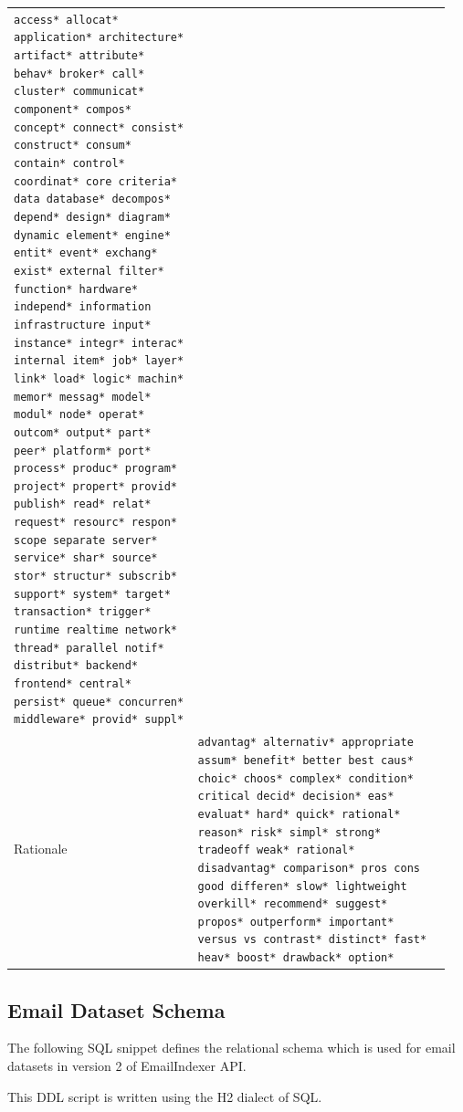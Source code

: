 \documentclass[a4paper, 12pt]{article}
\begin{document}
\begin{table}[H]
\begin{tabular}{p{0.4\linewidth} p{0.55\linewidth}}
				\texttt{access* allocat* application* architecture* artifact* attribute* behav* broker* call* cluster* communicat* component* compos* concept* connect* consist* construct* consum* contain* control* coordinat* core criteria* data database* decompos* depend* design* diagram* dynamic element* engine* entit* event* exchang* exist* external filter* function* hardware* independ* information infrastructure input* instance* integr* interac* internal item* job* layer* link* load* logic* machin* memor* messag* model* modul* node* operat* outcom* output* part* peer* platform* port* process* produc* program* project* propert* provid* publish* read* relat* request* resourc* respon* scope separate server* service* shar* source* stor* structur* subscrib* support* system* target* transaction* trigger* runtime realtime network* thread* parallel notif* distribut* backend* frontend* central* persist* queue* concurren* middleware* provid* suppl*}
				\\
				Rationale &
				\tiny
				\texttt{advantag* alternativ* appropriate assum* benefit* better best caus* choic* choos* complex* condition* critical decid* decision* eas* evaluat* hard* quick* rational* reason* risk* simpl* strong* tradeoff weak* rational* disadvantag* comparison* pros cons good differen* slow* lightweight overkill* recommend* suggest* propos* outperform* important* versus vs contrast* distinct* fast* heav* boost* drawback* option*}
				\\
			\end{tabular}
		\end{table}
	
	\newpage
	\subsection{Email Dataset Schema}
		\label{sec:dataset-schema}
		The following SQL snippet defines the relational schema which is used for email datasets in version 2 of EmailIndexer API.
		
		\footnotesize{This DDL script is written using the H2 dialect of SQL.}
		
\end{document}
